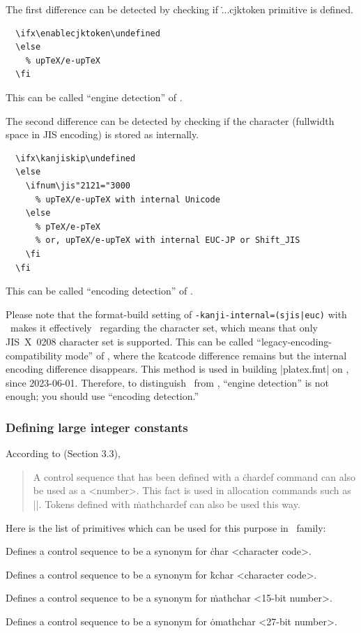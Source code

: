 \documentclass[a4paper,11pt,dvipdfmx]{article}
\begin{document}
The first difference can be detected by checking if
\.{...cjktoken} primitive is defined.
\begin{verbatim}
  \ifx\enablecjktoken\undefined
  \else
    % upTeX/e-upTeX
  \fi
\end{verbatim}
This can be called ``engine detection'' of \upTeX.

The second difference can be detected by checking if
the character  (fullwidth space in JIS encoding)
is stored as  internally.
\begin{verbatim}
  \ifx\kanjiskip\undefined
  \else
    \ifnum\jis"2121="3000
      % upTeX/e-upTeX with internal Unicode
    \else
      % pTeX/e-pTeX
      % or, upTeX/e-upTeX with internal EUC-JP or Shift_JIS
    \fi
  \fi
\end{verbatim}
This can be called ``encoding detection'' of \upTeX.

Please note that
the format-build setting of \verb+-kanji-internal=(sjis|euc)+ with
\upTeX\ makes it effectively \pTeX\ regarding the character set,
which means that only JIS~X~0208 character set is supported.
This can be called ``legacy-encoding-compatibility mode''
of \upTeX, where the \.{kcatcode} difference remains
but the internal encoding difference disappears.
This method is used in building |platex.fmt| on \eupTeX,
since 2023-06-01. Therefore, to distinguish \upLaTeX\ from \pLaTeX,
``engine detection'' is not enough; you should use ``encoding detection.''


\subsubsection{Defining large integer constants}
\label{chardef}

According to \cite{topic} (Section 3.3),
\begin{quote}
A control sequence that has been defined with a \.{chardef} command
can also be used as a <number>.
This fact is used in allocation commands such as |\newbox|.
Tokens defined with \.{mathchardef} can also be used this way.
\end{quote}
Here is the list of primitives which can be used for this purpose
in \pTeX\ family:
\begin{simplelist}
 \csitem[\.{chardef} <control sequence>=<character code>]
  Defines a control sequence to be a synonym for
  \.{char} <character code>.

 \csitem[\.{kchardef} <control sequence>=<character code> (for \upTeX/\eupTeX)]
  Defines a control sequence to be a synonym for
  \.{kchar} <character code>.

 \csitem[\.{mathchardef} <control sequence>=<15-bit number>]
  Defines a control sequence to be a synonym for
  \.{mathchar} <15-bit number>.

 \csitem[\.{omathchardef} <control sequence>=<27-bit number> (for \epTeX/\eupTeX)]
  Defines a control sequence to be a synonym for
  \.{omathchar} <27-bit number>.
\end{simplelist}
\end{document}
